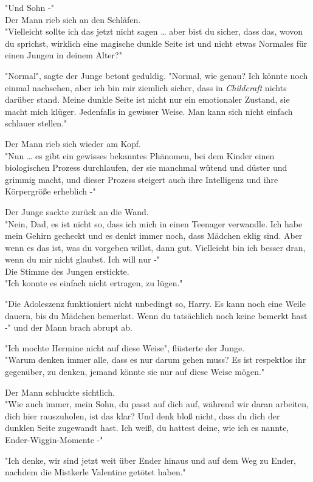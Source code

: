 {"Und Sohn -"\\ Der Mann rieb sich an den Schläfen.\\ "Vielleicht sollte ich das jetzt nicht sagen … aber bist du sicher, dass das, wovon du sprichst, wirklich eine magische dunkle Seite ist und nicht etwas Normales für einen Jungen in deinem Alter?"

"Normal", sagte der Junge betont geduldig. "Normal, wie genau? Ich könnte noch einmal nachsehen, aber ich bin mir ziemlich sicher, dass in \emph{Childcraft} nichts darüber stand. Meine dunkle Seite ist nicht nur ein emotionaler Zustand, sie macht mich klüger. Jedenfalls in gewisser Weise. Man kann sich nicht einfach schlauer stellen."

Der Mann rieb sich wieder am Kopf.\\ "Nun … es gibt ein gewisses bekanntes Phänomen, bei dem Kinder einen biologischen Prozess durchlaufen, der sie manchmal wütend und düster und grimmig macht, und dieser Prozess steigert auch ihre Intelligenz und ihre Körpergröße erheblich -"

Der Junge sackte zurück an die Wand.\\ "Nein, Dad, es ist nicht so, dass ich mich in einen Teenager verwandle. Ich habe mein Gehirn gecheckt und es denkt immer noch, dass Mädchen eklig sind. Aber wenn es das ist, was du vorgeben willst, dann gut. Vielleicht bin ich besser dran, wenn du mir nicht glaubst. Ich will nur -"\\ Die Stimme des Jungen erstickte.\\ "Ich konnte es einfach nicht ertragen, zu lügen."

"Die Adoleszenz funktioniert nicht unbedingt so, Harry. Es kann noch eine Weile dauern, bis du Mädchen bemerkst. Wenn du tatsächlich noch keine bemerkt hast -" und der Mann brach abrupt ab.

"Ich mochte Hermine nicht auf diese Weise", flüsterte der Junge.\\ "Warum denken immer alle, dass es nur darum gehen muss? Es ist respektlos ihr gegenüber, zu denken, jemand könnte sie nur auf diese Weise mögen."

Der Mann schluckte sichtlich.\\ "Wie auch immer, mein Sohn, du passt auf dich auf, während wir daran arbeiten, dich hier rauszuholen, ist das klar? Und denk bloß nicht, dass du dich der dunklen Seite zugewandt hast. Ich weiß, du hattest deine, wie ich es nannte, Ender-Wiggin-Momente -"

"Ich denke, wir sind jetzt weit über Ender hinaus und auf dem Weg zu Ender, nachdem die Mistkerle Valentine getötet haben."

}
